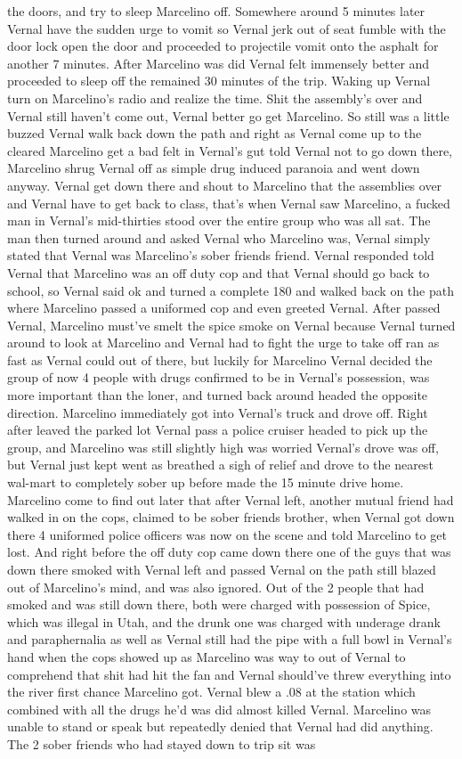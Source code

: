 \documentclass[12pt]{book}
\begin{document}
the doors, and try to sleep Marcelino off. Somewhere around 5 minutes later Vernal have the sudden urge to vomit so Vernal jerk out of seat fumble with the door lock open the door and proceeded to projectile vomit onto the asphalt for another 7 minutes. After Marcelino was did Vernal felt immensely better and proceeded to sleep off the remained 30 minutes of the trip. Waking up Vernal turn on Marcelino's radio and realize the time. Shit the assembly's over and Vernal still haven't come out, Vernal better go get Marcelino. So still was a little buzzed Vernal walk back down the path and right as Vernal come up to the cleared Marcelino get a bad felt in Vernal's gut told Vernal not to go down there, Marcelino shrug Vernal off as simple drug induced paranoia and went down anyway. Vernal get down there and shout to Marcelino that the assemblies over and Vernal have to get back to class, that's when Vernal saw Marcelino, a fucked man in Vernal's mid-thirties stood over the entire group who was all sat. The man then turned around and asked Vernal who Marcelino was, Vernal simply stated that Vernal was Marcelino's sober friends friend. Vernal responded told Vernal that Marcelino was an off duty cop and that Vernal should go back to school, so Vernal said ok and turned a complete 180 and walked back on the path where Marcelino passed a uniformed cop and even greeted Vernal. After passed Vernal, Marcelino must've smelt the spice smoke on Vernal because Vernal turned around to look at Marcelino and Vernal had to fight the urge to take off ran as fast as Vernal could out of there, but luckily for Marcelino Vernal decided the group of now 4 people with drugs confirmed to be in Vernal's possession, was more important than the loner, and turned back around headed the opposite direction. Marcelino immediately got into Vernal's truck and drove off. Right after leaved the parked lot Vernal pass a police cruiser headed to pick up the group, and Marcelino was still slightly high was worried Vernal's drove was off, but Vernal just kept went as breathed a sigh of relief and drove to the nearest wal-mart to completely sober up before made the 15 minute drive home. Marcelino come to find out later that after Vernal left, another mutual friend had walked in on the cops, claimed to be sober friends brother, when Vernal got down there 4 uniformed police officers was now on the scene and told Marcelino to get lost. And right before the off duty cop came down there one of the guys that was down there smoked with Vernal left and passed Vernal on the path still blazed out of Marcelino's mind, and was also ignored. Out of the 2 people that had smoked and was still down there, both were charged with possession of Spice, which was illegal in Utah, and the drunk one was charged with underage drank and paraphernalia as well as Vernal still had the pipe with a full bowl in Vernal's hand when the cops showed up as Marcelino was way to out of Vernal to comprehend that shit had hit the fan and Vernal should've threw everything into the river first chance Marcelino got. Vernal blew a .08 at the station which combined with all the drugs he'd was did almost killed Vernal. Marcelino was unable to stand or speak but repeatedly denied that Vernal had did anything. The 2 sober friends who had stayed down to trip sit was 
\end{document}
